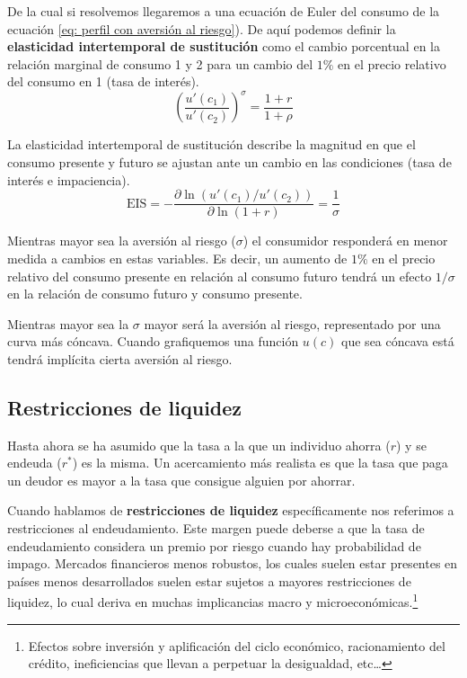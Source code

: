 De la cual si resolvemos llegaremos a una ecuación de Euler del consumo de la ecuación \ref{eq: perfil con aversión al riesgo}). De aquí podemos definir la \textbf{elasticidad intertemporal de sustitución} como el cambio porcentual en la relación marginal de consumo 1 y 2 para un cambio del $1\%$ en el precio relativo del consumo en 1 (tasa de interés). 
\begin{equation}
    \left( \frac{u'(c_1)}{u'(c_2)} \right) ^\sigma=  \frac{1+r}{1+\rho}  \label{eq: perfil con aversión al riesgo}
\end{equation}

La elasticidad intertemporal de sustitución describe la magnitud en que el consumo presente y futuro se ajustan ante un cambio en las condiciones (tasa de interés e impaciencia). 
\begin{equation}
    \text{EIS} = - \frac{\partial \ln (u'(c_1)/u'(c_2))}{\partial \ln (1+r)} = \frac{1}{\sigma}
\end{equation}

Mientras mayor sea la aversión al riesgo ($\sigma$) el consumidor responderá en menor medida a cambios en estas variables. Es decir, un aumento de $1\%$ en el precio relativo del consumo presente en relación al consumo futuro tendrá un efecto $1/\sigma$ en la relación de consumo futuro y consumo presente.

Mientras mayor sea la $\sigma$ mayor será la aversión al riesgo, representado por una curva más cóncava. Cuando grafiquemos una función $u(c)$ que sea cóncava está tendrá implícita cierta aversión al riesgo.

\subsection{Restricciones de liquidez}

Hasta ahora se ha asumido que la tasa a la que un individuo ahorra ($r$) y se endeuda ($r^*$) es la misma. Un acercamiento más realista es que la tasa que paga un deudor es mayor a la tasa que consigue alguien por ahorrar. 

Cuando hablamos de \textbf{restricciones de liquidez} específicamente nos referimos a restricciones al endeudamiento. Este margen puede deberse a que la tasa de endeudamiento considera un premio por riesgo cuando hay probabilidad de impago. Mercados financieros menos robustos, los cuales suelen estar presentes en países menos desarrollados suelen estar sujetos a mayores restricciones de liquidez, lo cual deriva en muchas implicancias macro y microeconómicas.\footnote{Efectos sobre inversión y aplificación del ciclo económico, racionamiento del crédito, ineficiencias que llevan a perpetuar la desigualdad, etc\ldots}

